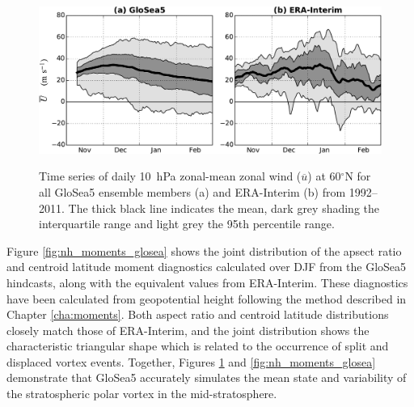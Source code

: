 \begin{figure}[t]
  \noindent\includegraphics[width=\textwidth,angle=0]{figures/chapter-seasonal/zmzw_climatologies_nh.pdf}\\
  \caption[NH comparison of GloSea5 and ERA-Interim zonal-mean zonal wind
  climatologies.]{Time series of daily 10~hPa zonal-mean zonal wind
    ($\overline{u}$) at 60$^{\circ}$N for all GloSea5 ensemble members (a) and
    ERA-Interim (b) from 1992--2011. The thick black line indicates the mean,
    dark grey shading the interquartile range and light grey the 95th percentile
    range.}\label{fig:nh_zmzw_clim}
\end{figure}

Figure \ref{fig:nh_moments_glosea} shows the joint distribution of the apsect
ratio and centroid latitude moment diagnostics calculated over DJF from the
GloSea5 hindcasts, along with the equivalent values from ERA-Interim. These
diagnostics have been calculated from geopotential height following the method
described in Chapter \ref{cha:moments}. Both aspect ratio and centroid latitude
distributions closely match those of ERA-Interim, and the joint distribution
shows the characteristic triangular shape which is related to the occurrence of
split and displaced vortex events. Together, Figures \ref{fig:nh_zmzw_clim} and
\ref{fig:nh_moments_glosea} demonstrate that GloSea5 accurately simulates the
mean state and variability of the stratospheric polar vortex in the
mid-stratosphere.  

